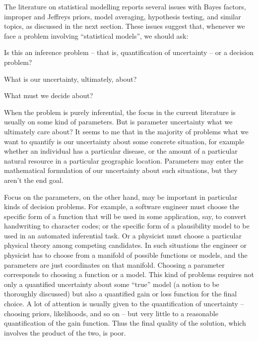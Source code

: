 \documentclass[\ifafour a4paper,12pt,\else a5paper,10pt,\fi%
onecolumn,oneside,article,%
british%
]{memoir}
\theoremstyle{remark}
\theoremstyle{innote}
\newcommand*{\citep}{\parencites}
\renewcommand*{\|}{\mathpunct{|}}
\begin{document}
The literature on statistical modelling reports several issues with Bayes
factors, improper and Jeffreys priors, model averaging, hypothesis testing,
and similar topics, as discussed in the next section. These issues suggest
that, whenever we face a problem involving \enquote{statistical models}, we
should ask:
\begin{enumerate*}[(\arabic*)]
\item Is this an inference problem -- that is, quantification of
  uncertainty -- or a decision problem?
\item What is our uncertainty, ultimately, about?
\item What must we decide about?
\end{enumerate*}

When the problem is purely inferential, the focus in the current literature
is usually on some kind of parameters. But is parameter uncertainty what we
ultimately care about? It seems to me that in the majority of problems what
we want to quantify is our uncertainty about some concrete situation, for
example whether an individual has a particular disease, or the amount of a
particular natural resource in a particular geographic location. Parameters
may enter the mathematical formulation of our uncertainty about such situations,
but they aren't the end goal.

Focus on the parameters, on the other hand, may be important in particular
kinds of decision problems. For example, a software engineer must choose
the specific form of a function that will be used in some application, say,
to convert handwriting to character codes; or the specific form of a
plausibility model to be used in an automated inferential task. Or a
physicist must choose a particular physical theory \citep[a problem
especially considered by][]{jeffreys1931_r1973,jeffreys1939_r1983} among
competing candidates. In such situations the engineer or physicist has to
choose from a manifold of possible functions or models, and the parameters
are just coordinates on that manifold. Choosing a parameter corresponds to
choosing a function or a model. This kind of problems requires not only a
quantified uncertainty about some \enquote{true} model (a notion to be
thoroughly discussed) but also a quantified gain or loss function for the
final choice. A lot of attention is usually given to the quantification of
uncertainty -- choosing priors, likelihoods, and so on -- but very little
to a reasonable quantification of the gain function. Thus the final quality
of the solution, which involves the product of the two, is poor.
\end{document}
